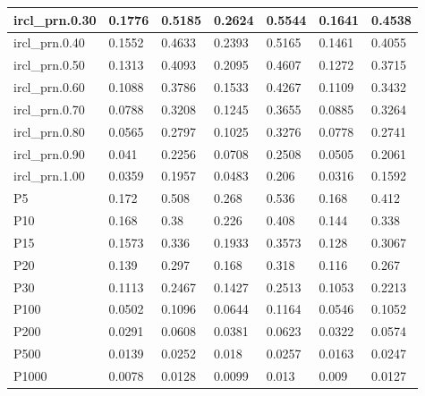 \documentclass[jair, twoside,11pt,theapa]{article}
\begin{document}
\begin{table}[h!]
\begin{tabular}{|l|l|l|l|l|l|l|}
ircl\_prn.0.30 & 0.1776    & 0.5185   & 0.2624    & 0.5544    & 0.1641    & 0.4538   \\ \hline
ircl\_prn.0.40 & 0.1552    & 0.4633   & 0.2393    & 0.5165    & 0.1461    & 0.4055   \\ \hline
ircl\_prn.0.50 & 0.1313    & 0.4093   & 0.2095    & 0.4607    & 0.1272    & 0.3715   \\ \hline
ircl\_prn.0.60 & 0.1088    & 0.3786   & 0.1533    & 0.4267    & 0.1109    & 0.3432   \\ \hline
ircl\_prn.0.70 & 0.0788    & 0.3208   & 0.1245    & 0.3655    & 0.0885    & 0.3264   \\ \hline
ircl\_prn.0.80 & 0.0565    & 0.2797   & 0.1025    & 0.3276    & 0.0778    & 0.2741   \\ \hline
ircl\_prn.0.90 & 0.041     & 0.2256   & 0.0708    & 0.2508    & 0.0505    & 0.2061   \\ \hline
ircl\_prn.1.00 & 0.0359    & 0.1957   & 0.0483    & 0.206     & 0.0316    & 0.1592   \\ \hline
P5             & 0.172     & 0.508    & 0.268     & 0.536     & 0.168     & 0.412    \\ \hline
P10            & 0.168     & 0.38     & 0.226     & 0.408     & 0.144     & 0.338    \\ \hline
P15            & 0.1573    & 0.336    & 0.1933    & 0.3573    & 0.128     & 0.3067   \\ \hline
P20            & 0.139     & 0.297    & 0.168     & 0.318     & 0.116     & 0.267    \\ \hline
P30            & 0.1113    & 0.2467   & 0.1427    & 0.2513    & 0.1053    & 0.2213   \\ \hline
P100           & 0.0502    & 0.1096   & 0.0644    & 0.1164    & 0.0546    & 0.1052   \\ \hline
P200           & 0.0291    & 0.0608   & 0.0381    & 0.0623    & 0.0322    & 0.0574   \\ \hline
P500           & 0.0139    & 0.0252   & 0.018     & 0.0257    & 0.0163    & 0.0247   \\ \hline
P1000          & 0.0078    & 0.0128   & 0.0099    & 0.013     & 0.009     & 0.0127   \\ \hline
\end{tabular}
\end{table}
\end{document}
